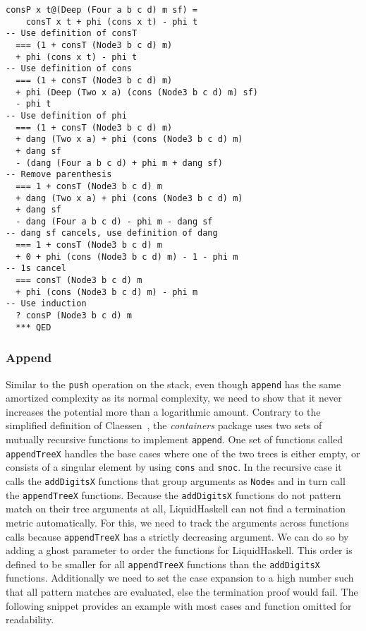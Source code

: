 \documentclass[sigplan,screen,review,anonymous]{acmart}
\begin{document}
\begin{lstlisting}
consP x t@(Deep (Four a b c d) m sf) =
    consT x t + phi (cons x t) - phi t
-- Use definition of consT
  === (1 + consT (Node3 b c d) m)
  + phi (cons x t) - phi t
-- Use definition of cons
  === (1 + consT (Node3 b c d) m)
  + phi (Deep (Two x a) (cons (Node3 b c d) m) sf)
  - phi t
-- Use definition of phi
  === (1 + consT (Node3 b c d) m)
  + dang (Two x a) + phi (cons (Node3 b c d) m)
  + dang sf
  - (dang (Four a b c d) + phi m + dang sf)
-- Remove parenthesis
  === 1 + consT (Node3 b c d) m
  + dang (Two x a) + phi (cons (Node3 b c d) m)
  + dang sf
  - dang (Four a b c d) - phi m - dang sf
-- dang sf cancels, use definition of dang
  === 1 + consT (Node3 b c d) m
  + 0 + phi (cons (Node3 b c d) m) - 1 - phi m
-- 1s cancel
  === consT (Node3 b c d) m
  + phi (cons (Node3 b c d) m) - phi m
-- Use induction
  ? consP (Node3 b c d) m
  *** QED
\end{lstlisting}

\subsubsection{Append}\label{sec:append}

Similar to the \texttt{push} operation on the stack, even though \texttt{append} has the same amortized complexity as its normal complexity, we need to show that it never increases the potential more than a logarithmic amount. Contrary to the simplified definition of Claessen~\cite{fingertrees_new}, the \textit{containers} package uses two sets of mutually recursive functions to implement \texttt{append}. One set of functions called \texttt{appendTreeX} handles the base cases where one of the two trees is either empty, or consists of a singular element by using \texttt{cons} and \texttt{snoc}. In the recursive case it calls the \texttt{addDigitsX} functions that group arguments as \texttt{Node}s and in turn call the \texttt{appendTreeX} functions. Because the \texttt{addDigitsX} functions do not pattern match on their tree arguments at all, LiquidHaskell can not find a termination metric automatically. For this, we need to track the arguments across functions calls because \texttt{appendTreeX} has a strictly decreasing argument. We can do so by adding a ghost parameter to order the functions for LiquidHaskell. This order is defined to be smaller for all \texttt{appendTreeX} functions than the \texttt{addDigitsX} functions. Additionally we need to set the case expansion to a high number such that all pattern matches are evaluated, else the termination proof would fail. The following snippet provides an example with most cases and function omitted for readability.
\end{document}
